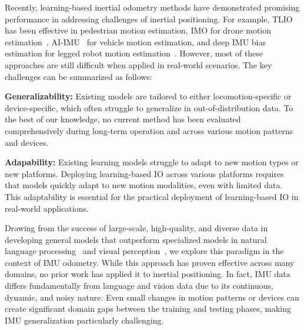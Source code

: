 Recently, learning-based inertial odometry methods have demonstrated promising performance in addressing challenges of inertial positioning. For example, TLIO~\cite{liu2020tlio} has been effective in pedestrian motion estimation, IMO for drone motion estimation~\cite{IMO}, AI-IMU~\cite{AI-IMU} for vehicle motion estimation, and deep IMU bias estimation for legged robot motion estimation~\cite{buchanan2022deep}. 
However, most of these approaches are still difficult when applied in real-world scenarios. 
The key challenges can be summarized as follows:

\textbf{Generalizability:} Existing models are tailored to either locomotion-specific or device-specific, which often struggle to generalize in out-of-distribution data. 
To the best of our knowledge, no current method has been evaluated comprehensively during long-term operation and across various motion patterns and devices.


\textbf{Adapability:} 
Existing learning models struggle to adapt to new motion types or new platforms. 
Deploying learning-based IO across various platforms requires that models quickly adapt to new motion modalities, even with limited data. 
This adaptability is essential for the practical deployment of learning-based IO in real-world applications.


%

Drawing from the success of large-scale, high-quality, and diverse data in developing general models that outperform specialized models in natural language processing~\cite{gpt4} and visual perception~\cite{oquab2023dinov2}, we explore this paradigm in the context of IMU odometry. While this approach has proven effective across many domains, no prior work has applied it to inertial positioning. In fact, IMU data differs fundamentally from language and vision data due to its continuous, dynamic, and noisy nature. Even small changes in motion patterns or devices can create significant domain gaps between the training and testing phases, making IMU generalization particularly challenging.


